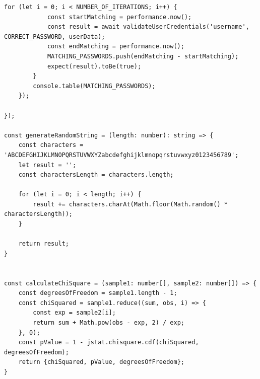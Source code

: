 \begin{lstlisting}[style=typescript,caption=Timing test for Hash Comparision,label=apendix:timing_test]
        for (let i = 0; i < NUMBER_OF_ITERATIONS; i++) {
            const startMatching = performance.now();
            const result = await validateUserCredentials('username', CORRECT_PASSWORD, userData);
            const endMatching = performance.now();
            MATCHING_PASSWORDS.push(endMatching - startMatching);
            expect(result).toBe(true);
        }
        console.table(MATCHING_PASSWORDS);
    });

});

const generateRandomString = (length: number): string => {
    const characters = 'ABCDEFGHIJKLMNOPQRSTUVWXYZabcdefghijklmnopqrstuvwxyz0123456789';
    let result = '';
    const charactersLength = characters.length;

    for (let i = 0; i < length; i++) {
        result += characters.charAt(Math.floor(Math.random() * charactersLength));
    }

    return result;
}


const calculateChiSquare = (sample1: number[], sample2: number[]) => {
    const degreesOfFreedom = sample1.length - 1;
    const chiSquared = sample1.reduce((sum, obs, i) => {
        const exp = sample2[i];
        return sum + Math.pow(obs - exp, 2) / exp;
    }, 0);
    const pValue = 1 - jstat.chisquare.cdf(chiSquared, degreesOfFreedom);
    return {chiSquared, pValue, degreesOfFreedom};
}

\end{lstlisting}



